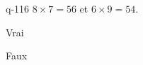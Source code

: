 \begin{truefalse}{q-116}
$8\times 7 = 56$ et $6\times 9 = 54$.
\item* Vrai
\item Faux
\end{truefalse}


